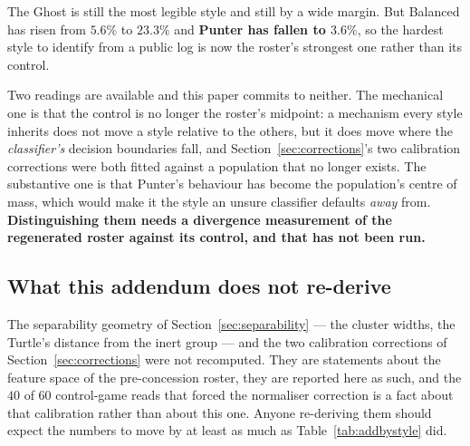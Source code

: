 \documentclass[11pt]{article}
\begin{document}
The Ghost is still the most legible style and still by a wide margin. But Balanced has risen from
$5.6\%$ to $23.3\%$ and \textbf{Punter has fallen to $3.6\%$}, so the hardest style to identify
from a public log is now the roster's strongest one rather than its control.

Two readings are available and this paper commits to neither. The mechanical one is that the
control is no longer the roster's midpoint: a mechanism every style inherits does not move a
style relative to the others, but it does move where the \emph{classifier's} decision boundaries
fall, and Section~\ref{sec:corrections}'s two calibration corrections were both fitted against a
population that no longer exists. The substantive one is that Punter's behaviour has become the
population's centre of mass, which would make it the style an unsure classifier defaults
\emph{away} from. \textbf{Distinguishing them needs a divergence measurement of the regenerated
roster against its control, and that has not been run.}

\subsection{What this addendum does not re-derive}

The separability geometry of Section~\ref{sec:separability} --- the cluster widths, the Turtle's
distance from the inert group --- and the two calibration corrections of
Section~\ref{sec:corrections} were not recomputed. They are statements about the feature space of
the pre-concession roster, they are reported here as such, and the $40$ of $60$ control-game reads
that forced the normaliser correction is a fact about that calibration rather than about this one.
Anyone re-deriving them should expect the numbers to move by at least as much as
Table~\ref{tab:addbystyle} did.
\end{document}

